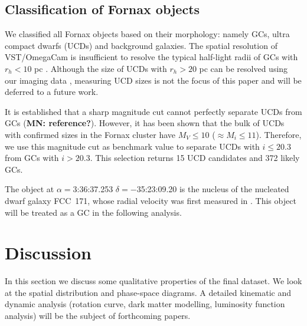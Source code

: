 \documentclass[useAMS,usenatbib]{mn2e}
\newcommand{\kms}{\mbox{\,km~s$^{-1}$}}
\begin{document}
\subsection{Classification of Fornax objects}

We classified all Fornax objects based on their morphology: namely GCs, ultra compact dwarfs (UCDs) and background galaxies. The spatial resolution of VST/OmegaCam is insufficient to resolve the typical half-light radii of GCs with $r_h < 10$ pc \citep{Masters, Puzia11}. Although the size of UCDs with $r_h > 20$ pc can be resolved using our imaging data \citep{Cantiello15}, measuring UCD sizes is not the focus of this paper and will be deferred to a future work.

It is established that a sharp magnitude cut cannot perfectly separate UCDs from GCs ({\bf MN: reference?}). However, it has been shown \citep{Voggel16, Eigenthaler18} that the bulk of UCDs with confirmed sizes in the Fornax cluster have $M_V \le 10$ ($\approx M_i \le 11$). 
Therefore, we use this magnitude cut as benchmark value to separate UCDs with $i \le 20.3$ from GCs with $i > 20.3$. This selection returns 15 UCD candidates and 372 likely GCs. 

The object at $\alpha=$3:36:37.253 $\delta=-$35:23:09.20 is the nucleus of the nucleated dwarf galaxy FCC~171, whose radial velocity was first measured in \citet{Bergond07}. This object will be treated as a GC in the following analysis.  

\section{Discussion}
\label{sec:discussion}
In this section we discuss some qualitative properties of the final dataset. We look at the spatial distribution and phase-space diagrams. A detailed kinematic and dynamic analysis (rotation curve, dark matter modelling, luminosity function analysis) will be the subject of forthcoming papers.
\end{document}
